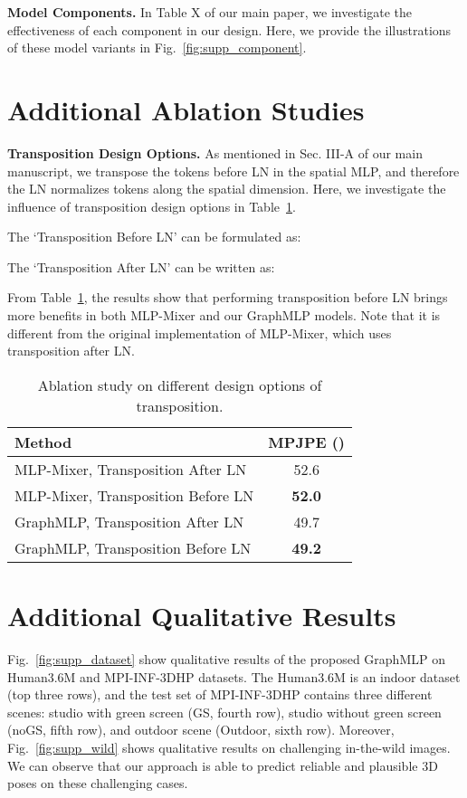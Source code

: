 \documentclass[lettersize,journal]{IEEEtran}
\begin{document}
\noindent \textbf{Model Components.}
In Table X of our main paper, we investigate the effectiveness of each component in our design. 
Here, we provide the illustrations of these model variants in Fig.~\ref{fig:supp_component}. 

\section{Additional Ablation Studies}
\label{sec:ablation}
\noindent \textbf{Transposition Design Options.}
As mentioned in Sec. III-A of our main manuscript, we transpose the tokens before LN in the spatial MLP, and therefore the LN normalizes tokens along the spatial dimension. 
Here, we investigate the influence of transposition design options in Table~\ref{table:transposition}. 

The `Transposition Before LN' can be formulated as:


The `Transposition After LN' can be written as:


From Table~\ref{table:transposition}, the results show that performing transposition before LN brings more benefits in both MLP-Mixer and our GraphMLP models. 
Note that it is different from the original implementation of MLP-Mixer, which uses transposition after LN. 

\begin{table}[!t]
  \centering
  \scriptsize
  \caption
  {Ablation study on different design options of transposition. 
  }
  \setlength{\tabcolsep}{5.30mm}
  \begin{tabular}{lc}
  \toprule
  Method &MPJPE ()  \\
  \midrule
  MLP-Mixer, Transposition After LN &52.6 \\
  MLP-Mixer, Transposition Before LN &\textbf{52.0} \\

  \midrule
  GraphMLP, Transposition After LN &49.7 \\
  GraphMLP, Transposition Before LN &\textbf{49.2} \\

  \toprule
  \end{tabular}
  \label{table:transposition}
\end{table}

\section{Additional Qualitative Results}
\label{sec:qualitative}
Fig.~\ref{fig:supp_dataset} show qualitative results of the proposed GraphMLP on Human3.6M and MPI-INF-3DHP datasets. 
The Human3.6M is an indoor dataset (top three rows), and the test set of MPI-INF-3DHP contains three different scenes: studio with green screen (GS, fourth row), studio without green screen (noGS, fifth row), and outdoor scene (Outdoor, sixth row). 
Moreover, Fig.~\ref{fig:supp_wild} shows qualitative results on challenging in-the-wild images. 
We can observe that our approach is able to predict reliable and plausible 3D poses on these challenging cases. 
\end{document}
